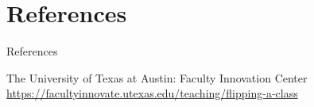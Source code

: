\documentclass[xcolor=table]{beamer}
\begin{document}
%
%  
%  



\section*{References}

\begin{frame}[allowframebreaks]{References}
    
  \begin{thebibliography}{10}

  	The University of Texas at Austin: \small
  	Faculty Innovation Center
    \newblock  \small \url{https://facultyinnovate.utexas.edu/teaching/flipping-a-class}
 
  \end{thebibliography}
\end{frame}
\end{document}
